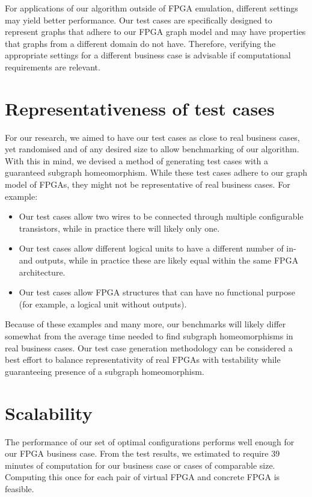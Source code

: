 For applications of our algorithm outside of FPGA emulation, different settings may yield better performance. Our test cases are specifically designed to represent graphs that adhere to our FPGA graph model and may have properties that graphs from a different domain do not have. Therefore, verifying the appropriate settings for a different business case is advisable if computational requirements are relevant.

\section{Representativeness of test cases}
For our research, we aimed to have our test cases as close to real business cases, yet randomised and of any desired size to allow benchmarking of our algorithm. With this in mind, we devised a method of generating test cases with a guaranteed subgraph homeomorphism. While these test cases adhere to our graph model of FPGAs, they might not be representative of real business cases. For example:

\begin{itemize}
\item Our test cases allow two wires to be connected through multiple configurable transistors, while in practice there will likely only one.
\item Our test cases allow different logical units to have a different number of in- and outputs, while in practice these are likely equal within the same FPGA architecture.
\item Our test cases allow FPGA structures that can have no functional purpose (for example, a logical unit without outputs).
\end{itemize}

Because of these examples and many more, our benchmarks will likely differ somewhat from the average time needed to find subgraph homeomorphisms in real business cases. Our test case generation methodology can be considered a best effort to balance representativity of real FPGAs with testability while guaranteeing presence of a subgraph homeomorphism.

\section{Scalability}

The performance of our set of optimal configurations performs well enough for our FPGA business case. From the test results, we estimated to require 39 minutes of computation for our business case or cases of comparable size. Computing this once for each pair of virtual FPGA and concrete FPGA is feasible.

